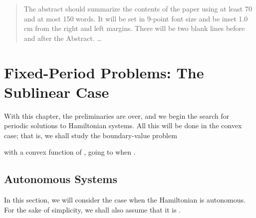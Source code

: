 \documentclass{llncs}
\begin{document}
\maketitle
\makeatletter
\renewenvironment{thebibliography}[1]
     {\section*{\refname}
      \small
      \list{}{\settowidth\labelwidth{}\leftmargin\parindent
            \itemindent=-\parindent
            \labelsep=\z@
            \if@openbib
              \advance\leftmargin\bibindent
              \itemindent -\bibindent
              \listparindent \itemindent
              \parsep \z@
            \fi
            \usecounter{enumiv}\let\p@enumiv\@empty
            \renewcommand\theenumiv{}}\if@openbib
        \renewcommand\newblock{\par}\else
        \renewcommand\newblock{\hskip .11em \@plus.33em \@minus.07em}\fi
      \sloppy\clubpenalty4000\widowpenalty4000\sfcode`\.=\@m}
     {\def\@noitemerr
       {\@latex@warning{Empty `thebibliography' environment}}\endlist}
      \def\@cite#1{#1}\def\@lbibitem[#1]#2{\item[]\if@filesw
        {\def\protect##1{\string ##1\space}\immediate
      \write\@auxout{\string\bibcite{#2}{#1}}}\fi\ignorespaces}
\makeatother
\begin{abstract}
The abstract should summarize the contents of the paper
using at least 70 and at most 150 words. It will be set in 9-point
font size and be inset 1.0 cm from the right and left margins.
There will be two blank lines before and after the Abstract. \dots
{}
\end{abstract}
\section{Fixed-Period Problems: The Sublinear Case}
With this chapter, the preliminaries are over, and we begin the search
for periodic solutions to Hamiltonian systems. All this will be done in
the convex case; that is, we shall study the boundary-value problem

with  a convex function of , going to  when
.

\subsection{Autonomous Systems}
In this section, we will consider the case when the Hamiltonian 
is autonomous. For the sake of simplicity, we shall also assume that it
is .
\end{document}

